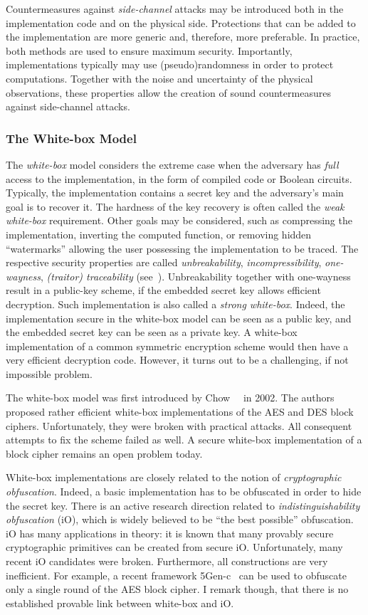 Countermeasures against \emph{side-channel} attacks may be introduced both in the implementation code and on the physical side. Protections that can be added to the implementation are more generic and, therefore, more preferable. In practice, both methods are used to ensure maximum security. Importantly, implementations typically may use (pseudo)randomness in order to protect computations. Together with the noise and uncertainty of the physical observations, these properties allow the creation of sound countermeasures against side-channel attacks.

\subsubsection{The White-box Model}
The \emph{white-box} model considers the extreme case when the adversary has \emph{full} access to the implementation, in the form of compiled code or Boolean circuits. Typically, the implementation contains a secret key and the adversary's main goal is to recover it. The hardness of the key recovery is often called the \emph{weak white-box} requirement. Other goals may be considered, such as compressing the implementation, inverting the computed function, or removing hidden ``watermarks'' allowing the user possessing the implementation to be traced. The respective security properties are called \emph{unbreakability}, \emph{incompressibility}, \emph{one-wayness}, \emph{(traitor) traceability} (see~\cite{wbNotionsOld,wbNotions}).
Unbreakability together with one-wayness result in a public-key scheme, if the embedded secret key allows efficient decryption. Such implementation is also called a \emph{strong white-box}. Indeed, the implementation secure in the white-box model can be seen as a public key, and the embedded secret key can be seen as a private key. A white-box implementation of a common symmetric encryption scheme would then have a very efficient decryption code. However, it turns out to be a challenging, if not impossible problem.

The white-box model was first introduced by Chow~\etal{}~\cite{ChowAES,ChowDES} in 2002. The authors proposed rather efficient white-box implementations of the AES and DES block ciphers. Unfortunately, they were broken with practical attacks. All consequent attempts to fix the scheme failed as well. A secure white-box implementation of a block cipher remains an open problem today.

White-box implementations are closely related to the notion of \emph{cryptographic obfuscation}. Indeed, a basic implementation has to be obfuscated in order to hide the secret key. There is an active research direction related to \emph{indistinguishability obfuscation} (iO), which is widely believed to be ``the best possible'' obfuscation. iO has many applications in theory: it is known that many provably secure cryptographic primitives can be created from secure iO. Unfortunately, many recent iO candidates were broken. Furthermore, all constructions are very inefficient. For example, a recent framework 5Gen-c~\cite{5GEN} can be used to obfuscate only a single round of the AES block cipher. I remark though, that there is no established provable link between white-box and iO.

